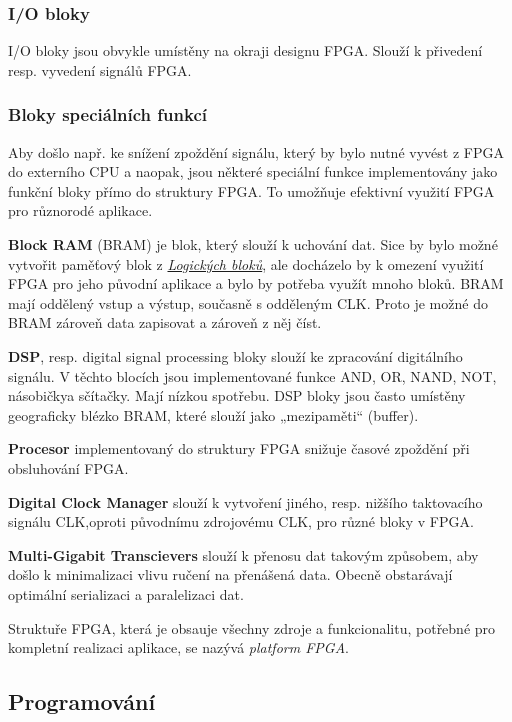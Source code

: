 \documentclass[a4paper, twoside, 11pt]{article}
\begin{document}
		\subsubsection{I/O bloky}
				I/O bloky jsou obvykle umístěny na okraji designu FPGA. Slouží k přivedení resp. vyvedení signálů FPGA. \cite{Sass2010}

		\subsubsection{Bloky speciálních funkcí}
			Aby došlo např. ke snížení zpoždění signálu, který by bylo nutné vyvést z FPGA do externího CPU a naopak, jsou některé speciální funkce implementovány jako funkční bloky přímo do struktury FPGA. To umožňuje efektivní využití FPGA pro různorodé aplikace. \cite{Sass2010}\par
			\textbf{Block RAM} (BRAM) je blok, který slouží k uchování dat. Sice by bylo možné vytvořit paměťový blok z \hyperref[subsubsec:logicke-bloky]{\textit{Logických bloků}}, ale docházelo by k omezení využití FPGA pro jeho původní aplikace a bylo by potřeba využít mnoho bloků. BRAM mají oddělený vstup a výstup, současně s odděleným CLK. Proto je možné do BRAM zároveň data zapisovat a zároveň z něj číst. \cite{Sass2010}\par
			\textbf{DSP}, resp. digital signal processing bloky slouží ke zpracování digitálního signálu. V těchto blocích jsou implementované funkce AND, OR, NAND, NOT, násobičkya sčítačky. Mají nízkou spotřebu. DSP bloky jsou často umístěny geograficky blézko BRAM, které slouží jako „mezipaměti“ (buffer). \cite{Sass2010}\par
			\textbf{Procesor} implementovaný do struktury FPGA snižuje časové zpoždění při obsluhování FPGA. \cite{Sass2010}\par
			\textbf{Digital Clock Manager} slouží k vytvoření jiného, resp. nižšího taktovacího signálu CLK,oproti původnímu zdrojovému CLK, pro různé bloky v FPGA. \cite{Sass2010}\par
			\textbf{Multi-Gigabit Transcievers} slouží k přenosu dat takovým způsobem, aby došlo k minimalizaci vlivu ručení na přenášená data. Obecně obstarávají optimální serializaci a paralelizaci dat. \cite{Sass2010}\par
			Struktuře FPGA, která je obsauje všechny zdroje a funkcionalitu, potřebné pro kompletní realizaci aplikace, se nazývá \textit{platform FPGA}.
		\subsection{Programování}
\end{document}
